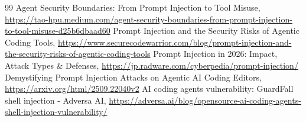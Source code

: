 \documentclass[a4paper,11pt]{ltjsarticle}
\begin{document}
\begin{thebibliography}{99}
 Agent Security Boundaries: From Prompt Injection to Tool Misuse, \url{https://tao-hpu.medium.com/agent-security-boundaries-from-prompt-injection-to-tool-misuse-d25b6dbaad60}
 Prompt Injection and the Security Risks of Agentic Coding Tools, \url{https://www.securecodewarrior.com/blog/prompt-injection-and-the-security-risks-of-agentic-coding-tools}
 Prompt Injection in 2026: Impact, Attack Types \& Defenses, \url{https://jp.radware.com/cyberpedia/prompt-injection/}
 Demystifying Prompt Injection Attacks on Agentic AI Coding Editors, \url{https://arxiv.org/html/2509.22040v2}
 AI coding agents vulnerability: GuardFall shell injection - Adversa AI, \url{https://adversa.ai/blog/opensource-ai-coding-agents-shell-injection-vulnerability/}
\end{thebibliography}
\end{document}
